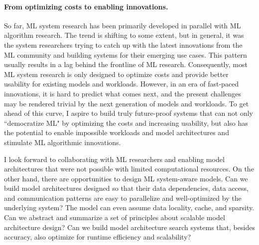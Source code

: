 \documentclass[letterpaper]{article}
\begin{document}
\paragraph{From optimizing costs to enabling innovations.}So far, ML system research has been primarily developed in parallel with ML algorithm research. The trend is shifting to some extent, but in general, it was the system researchers trying to catch up with the latest innovations from the ML community and building systems for their emerging use cases. This pattern usually results in a lag behind the frontline of ML research. Consequently, most ML system research is only designed to optimize costs and provide better usability for existing models and workloads. However, in an era of fast-paced innovations, it is hard to predict what comes next, and the present challenges may be rendered trivial by the next generation of models and workloads. To get ahead of this curve, I aspire to build truly future-proof systems that can not only ``democratize ML" by optimizing the costs and increasing usability, but also has the potential to enable impossible workloads and model architectures and stimulate ML algorithmic innovations.

I look forward to collaborating with ML researchers and enabling model architectures that were not possible with limited computational resources. On the other hand, there are opportunities to design ML system-aware models. Can we build model architectures designed so that their data dependencies, data access, and communication patterns are easy to parallelize and well-optimized by the underlying system? The model can even assume data locality, cache, and sparsity. Can we abstract and summarize a set of principles about scalable model architecture design? Can we build model architecture search systems that, besides accuracy, also optimize for runtime efficiency and scalability?










\end{document}
